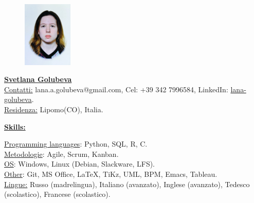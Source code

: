 \documentclass[a4paper,10pt,fullpage]{article}
\begin{document}


\begin{figure}
	\includegraphics[width=0.21\textwidth]{photo1}
\end{figure}

\underline{\textbf{\LARGE Svetlana Golubeva}}\\

\underline{Contatti:} lana.a.golubeva@gmail.com, Cel: +39 342 7996584, LinkedIn: \href{https://www.linkedin.com/in/lana-golubeva/}{lana-golubeva}. \\
\underline{Residenza:} Lipomo(CO), Italia. %



\begin{center}
	\underline{\textbf{\large Skills:}}
\end{center}
\underline{Programming languages}: Python, SQL, R, C.\\
\underline{Metodologie}: Agile, Scrum, Kanban.\\
\underline{OS}: Windows, Linux (Debian, Slackware, LFS).\\
\underline{Other}: Git, MS Office, \LaTeX, TiKz, UML, BPM, Emacs, Tableau.\\
\underline{Lingue:} Russo (madrelingua), Italiano (avanzato), Inglese (avanzato), Tedesco (scolastico), Francese (scolastico).\\
\end{document}
